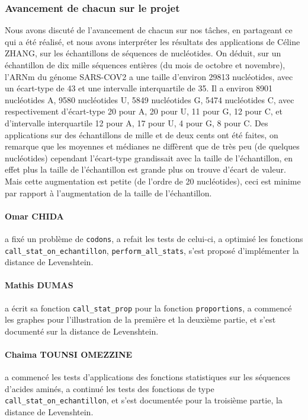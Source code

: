 \subsubsection*{Avancement de chacun sur le projet}
Nous avons discuté de l'avancement de chacun sur nos tâches, en partageant ce qui a été réalisé, et nous avons interpréter les résultats des applications de Céline ZHANG, sur les échantillons de séquences de nucléotides. On déduit, sur un échantillon de dix mille séquences entières (du mois de octobre et novembre), l'ARNm du génome SARS-COV2 a une taille d'environ 29813 nucléotides, avec un écart-type de 43 et une intervalle interquartile de 35. Il a environ 8901 nucléotides A, 9580 nucléotides U, 5849 nucléotides G, 5474 nucléotides C, avec respectivement d'écart-type 20 pour A, 20 pour U, 11 pour G, 12 pour C, et d'intervalle interquartile 12 pour A, 17 pour U, 4 pour G, 8 pour C. Des applications sur des échantillons de mille et de deux cents ont été faites, on remarque que les moyennes et médianes ne diffèrent que de très peu (de quelques nucléotides) cependant l'écart-type grandissait avec la taille de l'échantillon, en effet plus la taille de l'échantillon est grande plus on trouve d'écart de valeur. Mais cette augmentation est petite (de l'ordre de 20 nucléotides), ceci est minime par rapport à l'augmentation de la taille de l'échantillon.
\paragraph*{Omar CHIDA} a fixé un problème de \texttt{codons}, a refait les tests de celui-ci, a optimisé les fonctions \texttt{call\_stat\_on\_echantillon}, \texttt{perform\_all\_stats}, s'est proposé d'implémenter la distance de Levenshtein.

\paragraph*{Mathis DUMAS} a écrit sa fonction \texttt{call\_stat\_prop} pour la fonction \texttt{proportions}, a commencé les graphes pour l'illustration de la première et la deuxième partie, et s'est documenté sur la distance de Levenshtein.

\paragraph*{Chaima TOUNSI OMEZZINE} a commencé les tests d'applications des fonctions statistiques sur les séquences d'acides aminés, a continué les tests des fonctions de type \texttt{call\_stat\_on\_echantillon}, et s'est documentée pour la troisième partie, la distance de Levenshtein.

